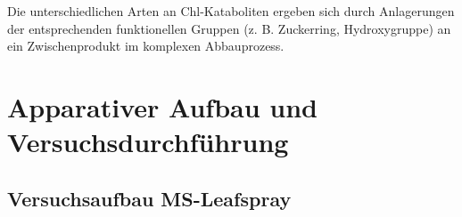 \documentclass[12pt,a4paper]{article}
\begin{document}
Die unterschiedlichen Arten an Chl-Kataboliten ergeben sich durch Anlagerungen der entsprechenden funktionellen Gruppen (z. B. Zuckerring, Hydroxygruppe) an ein Zwischenprodukt im komplexen Abbauprozess. \cite{ChlorophyllCatabolites} \\


\pagebreak

\section{Apparativer Aufbau und Versuchsdurchführung}

\subsection{Versuchsaufbau MS-Leafspray} \label{sec:Versuchsaufbau}

\end{document}
